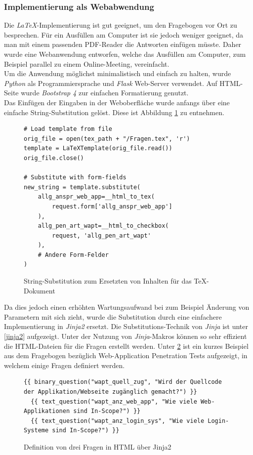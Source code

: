 \subsubsection{Implementierung als Webabwendung}\label{ref:AufImplInWeb}
Die \textit{LaTeX}-Implementierung ist gut geeignet, um den Fragebogen vor Ort zu besprechen. Für ein Ausfüllen am Computer ist sie jedoch weniger geeignet, da man mit einem passenden PDF-Reader die Antworten einfügen müsste. Daher wurde eine Webanwendung entworfen, welche das Ausfüllen am Computer, zum Beispiel parallel zu einem Online-Meeting, vereinfacht.\\

Um die Anwendung möglichst minimalistisch und einfach zu halten, wurde \textit{Python} als Programmiersprache und \textit{Flask} Web-Server verwendet. Auf HTML-Seite wurde \textit{Bootstrap 4} zur einfachen Formatierung genutzt.\\

Das Einfügen der Eingaben in der Weboberfläche wurde anfangs über eine einfache String-Substitution gelöst. Diese ist Abbildung \ref{lst:PenProzVorbereitStringSub} zu entnehmen.
\begin{figure}
\lstset{language=Python}
\begin{lstlisting}
# Load template from file
orig_file = open(tex_path + "/Fragen.tex", 'r')
template = LaTeXTemplate(orig_file.read())
orig_file.close()

# Substitute with form-fields
new_string = template.substitute(
    allg_anspr_web_app=__html_to_tex(
        request.form['allg_anspr_web_app']
    ),
    allg_pen_art_wapt=__html_to_checkbox(
        request, 'allg_pen_art_wapt'
    ),
    # Andere Form-Felder
)
\end{lstlisting}
\caption{String-Substitution zum Ersetzten von Inhalten für das TeX-Dokument}
\label{lst:PenProzVorbereitStringSub}
\end{figure}
Da dies jedoch einen erhöhten Wartungsaufwand bei zum Beispiel Änderung von Parametern mit sich zieht, wurde die Substitution durch eine einfachere Implementierung in \textit{Jinja2} ersetzt. Die Substitutions-Technik von \textit{Jinja} ist unter \ref{jinja2} aufgezeigt. Unter der Nutzung von \textit{Jinja}-Makros können so sehr effizient die HTML-Dateien für die Fragen erstellt werden. Unter \ref{lis:PenProzAufwFragHTMLJinja} ist ein kurzes Beispiel aus dem Fragebogen bezüglich Web-Application Penetration Tests aufgezeigt, in welchem einige Fragen definiert werden.

\begin{figure}[htbp]
\begin{lstlisting}
{{ binary_question("wapt_quell_zug", "Wird der Quellcode der Applikation/Webseite zugänglich gemacht?") }}
  {{ text_question("wapt_anz_web_app", "Wie viele Web-Applikationen sind In-Scope?") }}
  {{ text_question("wapt_anz_login_sys", "Wie viele Login-Systeme sind In-Scope?") }}
\end{lstlisting}
\caption{Definition von drei Fragen in HTML über Jinja2}
\label{lis:PenProzAufwFragHTMLJinja}
\end{figure}

